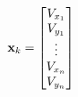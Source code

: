 \documentclass[preview]{standalone}
\begin{document}
\begin{align*}
\special{dvisvgm:raw <g id='unique000'>}\mathbf{x}_k = \begin{bmatrix} V_{x_1} \\ V_{y_1} \\ \vdots \\ V_{x_n} \\ V_{y_n} \end{bmatrix}\special{dvisvgm:raw </g>}
\end{align*}
\end{document}
